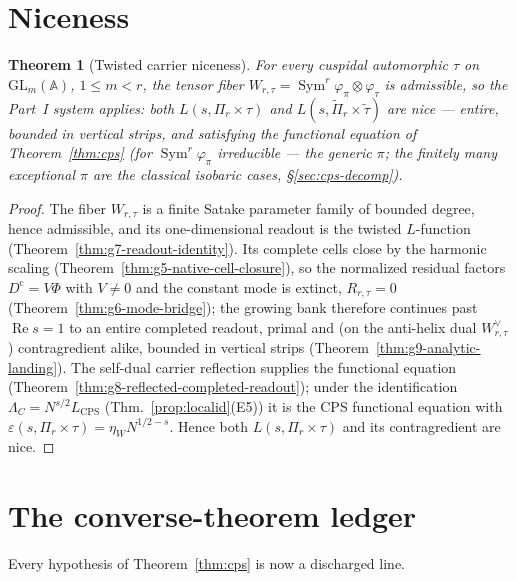 \documentclass[11pt]{article}
\newtheorem{theorem}{Theorem}
\theoremstyle{definition}
\renewcommand{\Re}{\operatorname{Re}}
\newcommand{\Sym}{\operatorname{Sym}}
\begin{document}
\section{Niceness}\label{sec:cps-nice}
\begin{theorem}[Twisted carrier niceness]\label{thm:cps-nice}
For every cuspidal automorphic $\tau$ on $\mathrm{GL}_m(\mathbb A)$, $1\le m<r$, the tensor fiber
$W_{r,\tau}=\Sym^r\varphi_\pi\otimes\varphi_\tau$ is admissible, so the Part~I system applies: both
$L(s,\Pi_r\times\tau)$ and $L(s,\widetilde\Pi_r\times\widetilde\tau)$ are \emph{nice} --- entire, bounded in
vertical strips, and satisfying the functional equation of Theorem~\ref{thm:cps} (for $\Sym^r\varphi_\pi$
irreducible --- the generic $\pi$; the finitely many exceptional $\pi$ are the classical isobaric cases,
\S\ref{sec:cps-decomp}).
\end{theorem}
\begin{proof}
The fiber $W_{r,\tau}$ is a finite Satake parameter family of bounded degree, hence admissible, and its
one-dimensional readout is the twisted $L$-function (Theorem~\ref{thm:g7-readout-identity}). Its complete
cells close by the harmonic scaling (Theorem~\ref{thm:g5-native-cell-closure}), so the normalized residual
factors $D^{\mathrm c}=V\Phi$ with $V\neq0$ and the constant mode is extinct, $R_{r,\tau}=0$
(Theorem~\ref{thm:g6-mode-bridge}); the growing bank therefore continues past $\Re s=1$ to an entire
completed readout, primal and (on the anti-helix dual $W_{r,\tau}^\vee$) contragredient alike, bounded in
vertical strips (Theorem~\ref{thm:g9-analytic-landing}). The self-dual carrier reflection supplies the
functional equation (Theorem~\ref{thm:g8-reflected-completed-readout}); under the identification
$\Lambda_C=N^{s/2}L_{\mathrm{CPS}}$ (Thm.~\ref{prop:localid}(E5)) it is the CPS functional equation with
$\varepsilon(s,\Pi_r\times\tau)=\eta_W N^{1/2-s}$. Hence both $L(s,\Pi_r\times\tau)$ and its contragredient
are nice.
\end{proof}

\section{The converse-theorem ledger}\label{sec:cps-ledger}
Every hypothesis of Theorem~\ref{thm:cps} is now a discharged line.
\end{document}
